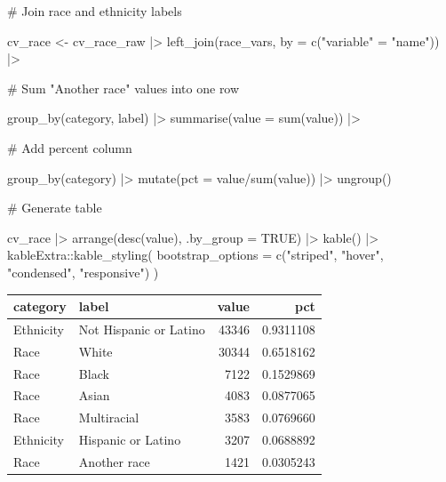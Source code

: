 \documentclass[
  letterpaper,
  DIV=11,
  numbers=noendperiod]{scrartcl}
\newenvironment{Shaded}{\begin{snugshade}}{\end{snugshade}}
\newcommand{\AttributeTok}[1]{\textcolor[rgb]{0.40,0.45,0.13}{#1}}
\newcommand{\CommentTok}[1]{\textcolor[rgb]{0.37,0.37,0.37}{#1}}
\newcommand{\ConstantTok}[1]{\textcolor[rgb]{0.56,0.35,0.01}{#1}}
\newcommand{\FunctionTok}[1]{\textcolor[rgb]{0.28,0.35,0.67}{#1}}
\newcommand{\NormalTok}[1]{\textcolor[rgb]{0.00,0.23,0.31}{#1}}
\newcommand{\OtherTok}[1]{\textcolor[rgb]{0.00,0.23,0.31}{#1}}
\newcommand{\SpecialCharTok}[1]{\textcolor[rgb]{0.37,0.37,0.37}{#1}}
\newcommand{\StringTok}[1]{\textcolor[rgb]{0.13,0.47,0.30}{#1}}
\begin{document}
\begin{Shaded}
\begin{Highlighting}[]
\CommentTok{\# Join race and ethnicity labels}

\NormalTok{cv\_race }\OtherTok{\textless{}{-}}\NormalTok{ cv\_race\_raw }\SpecialCharTok{|\textgreater{}} 
  \FunctionTok{left\_join}\NormalTok{(race\_vars, }\AttributeTok{by =} \FunctionTok{c}\NormalTok{(}\StringTok{"variable"} \OtherTok{=} \StringTok{"name"}\NormalTok{)) }\SpecialCharTok{|\textgreater{}} 
  
  \CommentTok{\# Sum "Another race" values into one row}
  
  \FunctionTok{group\_by}\NormalTok{(category, label) }\SpecialCharTok{|\textgreater{}} 
  \FunctionTok{summarise}\NormalTok{(}\AttributeTok{value =} \FunctionTok{sum}\NormalTok{(value)) }\SpecialCharTok{|\textgreater{}} 
  
  \CommentTok{\# Add percent column}
  
  \FunctionTok{group\_by}\NormalTok{(category) }\SpecialCharTok{|\textgreater{}} 
  \FunctionTok{mutate}\NormalTok{(}\AttributeTok{pct =}\NormalTok{ value}\SpecialCharTok{/}\FunctionTok{sum}\NormalTok{(value)) }\SpecialCharTok{|\textgreater{}} 
  \FunctionTok{ungroup}\NormalTok{()}

\CommentTok{\# Generate table}

\NormalTok{cv\_race }\SpecialCharTok{|\textgreater{}} 
  \FunctionTok{arrange}\NormalTok{(}\FunctionTok{desc}\NormalTok{(value), }\AttributeTok{.by\_group =} \ConstantTok{TRUE}\NormalTok{) }\SpecialCharTok{|\textgreater{}} 
  \FunctionTok{kable}\NormalTok{() }\SpecialCharTok{|\textgreater{}} 
\NormalTok{  kableExtra}\SpecialCharTok{::}\FunctionTok{kable\_styling}\NormalTok{(}
    \AttributeTok{bootstrap\_options =} \FunctionTok{c}\NormalTok{(}\StringTok{"striped"}\NormalTok{, }\StringTok{"hover"}\NormalTok{, }\StringTok{"condensed"}\NormalTok{, }\StringTok{"responsive"}\NormalTok{)}
\NormalTok{  )}
\end{Highlighting}
\end{Shaded}

\begin{table}
\centering
\begin{tabular}{l|l|r|r}
\hline
category & label & value & pct\\
\hline
Ethnicity & Not Hispanic or Latino & 43346 & 0.9311108\\
\hline
Race & White & 30344 & 0.6518162\\
\hline
Race & Black & 7122 & 0.1529869\\
\hline
Race & Asian & 4083 & 0.0877065\\
\hline
Race & Multiracial & 3583 & 0.0769660\\
\hline
Ethnicity & Hispanic or Latino & 3207 & 0.0688892\\
\hline
Race & Another race & 1421 & 0.0305243\\
\hline
\end{tabular}
\end{table}
\end{document}
